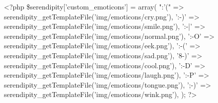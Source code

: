 \begin{ospcode}
<?php
\$serendipity['custom\_emoticons'] = array(
 ":'("  => serendipity\_getTemplateFile('img/emoticons/cry.png'),
 ':-)'  => serendipity\_getTemplateFile('img/emoticons/smile.png'),
 ':-|'  => serendipity\_getTemplateFile('img/emoticons/normal.png'),
 ':-O'  => serendipity\_getTemplateFile('img/emoticons/eek.png'),
 ':-('  => serendipity\_getTemplateFile('img/emoticons/sad.png'),
 '8-)'  => serendipity\_getTemplateFile('img/emoticons/cool.png'),
 ':-D'  => serendipity\_getTemplateFile('img/emoticons/laugh.png'),
 ':-P'  => serendipity\_getTemplateFile('img/emoticons/tongue.png'),
 ';-)'  => serendipity\_getTemplateFile('img/emoticons/wink.png'),
);
?>
\end{ospcode}
